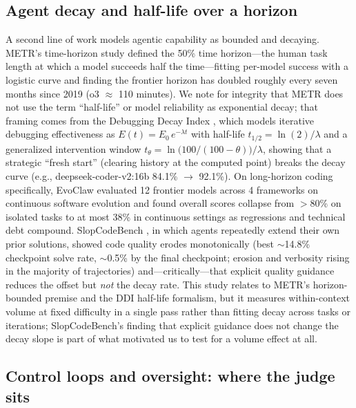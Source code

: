 \documentclass[11pt]{article}
\begin{document}
\subsection{Agent decay and half-life over a horizon}
\label{sec:rw-decay}

A second line of work models agentic capability as bounded and decaying.
METR's time-horizon study \cite{kwa2025metr} defined the 50\% time
horizon---the human task length at which a model succeeds half the
time---fitting per-model success with a logistic curve and finding the
frontier horizon has doubled roughly every seven months since 2019
(o3 $\approx$ 110 minutes). We note for integrity that METR does not use the
term ``half-life'' or model reliability as exponential decay; that framing
comes from the Debugging Decay Index \cite{adnan2025ddi}, which models
iterative debugging effectiveness as $E(t) = E_0\,e^{-\lambda t}$ with
half-life $t_{1/2} = \ln(2)/\lambda$ and a generalized intervention window
$t_\theta = \ln\!\big(100/(100-\theta)\big)/\lambda$, showing that a strategic
``fresh start'' (clearing history at the computed point) breaks the decay
curve (e.g., deepseek-coder-v2:16b 84.1\% $\to$ 92.1\%). On long-horizon
coding specifically, EvoClaw \cite{deng2026evoclaw} evaluated 12 frontier
models across 4 frameworks on continuous software evolution and found overall
scores collapse from $>$80\% on isolated tasks to at most 38\% in continuous
settings as regressions and technical debt compound. SlopCodeBench
\cite{orlanski2026slopcodebench}, in which agents repeatedly extend their own
prior solutions, showed code quality erodes monotonically (best $\sim$14.8\%
checkpoint solve rate, $\sim$0.5\% by the final checkpoint; erosion and
verbosity rising in the majority of trajectories) and---critically---that
explicit quality guidance reduces the offset but \emph{not} the decay rate.
This study relates to METR's horizon-bounded premise and the DDI half-life formalism, but it measures within-context volume at fixed difficulty in a single pass rather than fitting decay across tasks or iterations; SlopCodeBench's finding that explicit guidance does not change the decay slope is part of what motivated us to test for a volume effect at all.

\subsection{Control loops and oversight: where the judge sits}
\label{sec:rw-control}
\end{document}
